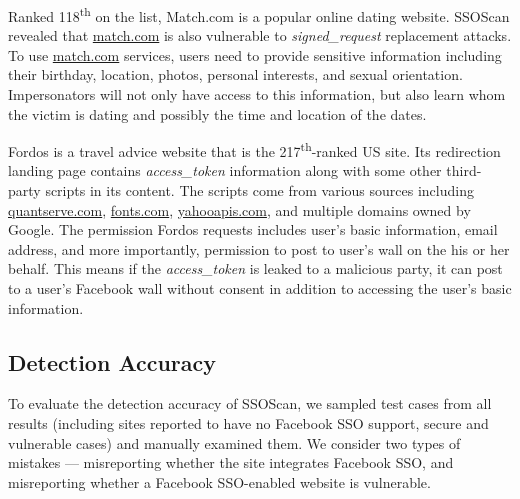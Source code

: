  Ranked 118\textsuperscript{th} on the list, Match.com is a popular online dating website.  SSOScan revealed that \url{match.com} is also vulnerable to \emph{signed\_request} replacement attacks.  To use \url{match.com} services, users need to provide sensitive information including their birthday, location, photos, personal interests, and sexual orientation.  Impersonators will not only have access to this information, but also learn whom the victim is dating and possibly the time and location of the dates.

 Fordos is a travel advice website that is the 217\textsuperscript{th}-ranked US site.  Its redirection landing page contains \emph{access\_token} information along with some other third-party scripts in its content.  The scripts come from various sources including \url{quantserve.com}, \url{fonts.com}, \url{yahooapis.com}, and multiple domains owned by Google.  The permission Fordos requests includes user's basic information, email address, and more importantly, permission to post to user's wall on the his or her behalf. This means if the \emph{access\_token} is leaked to a malicious party, it can post to a user's Facebook wall without consent in addition to accessing the user's basic information. 


\subsection{Detection Accuracy}
\label{sec:toolEffectiveness}
To evaluate the detection accuracy of SSOScan, we sampled test cases from all results (including sites reported to have no Facebook SSO support, secure and vulnerable cases) and manually examined them.  We consider two types of mistakes --- misreporting whether the site integrates Facebook SSO, and misreporting whether a Facebook SSO-enabled website is vulnerable.  

